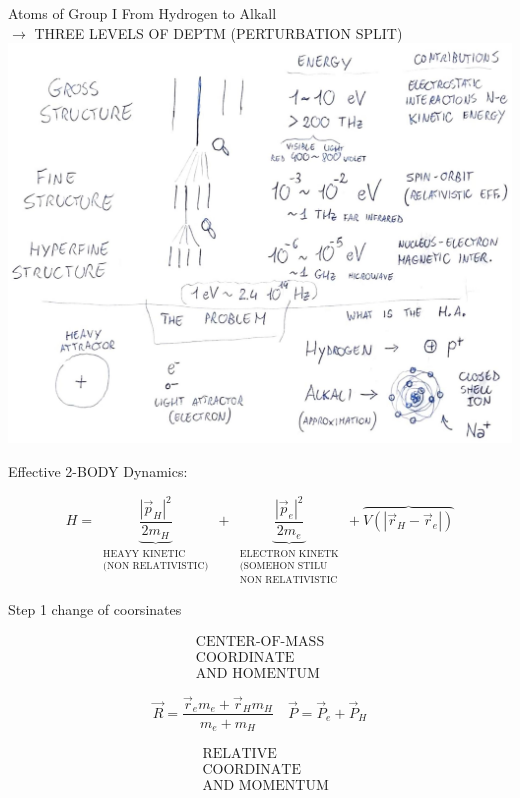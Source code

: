 \documentclass[10pt]{article}
\begin{document}
\captionsetup{singlelinecheck=false}
Atoms of Group I From Hydrogen to Alkall\\
$\rightarrow$ THREE LEVELS OF DEPTM (PERTURBATION SPLIT)\\
\includegraphics[max width=\textwidth, center]{2025_10_16_22329e0f50bdd2511b17g-01}

Effective 2-BODY Dynamics:

$$
H=\underbrace{\frac{\left|\vec{p}_{H}\right|^{2}}{2 m_{H}}}_{\substack{\text { HEAYY KINETIC } \\ \text { (NON RELATIVISTIC) }}}+\underbrace{\frac{\left|\vec{p}_{e}\right|^{2}}{2 m_{e}}}_{\substack{\text { ELECTRON KINETK } \\ \text { (SOMEHON STILU } \\ \text { NON RELATIVISTIC }}}+\overbrace{V\left(\left|\vec{r}_{H}-\vec{r}_{e}\right|\right)}
$$

Step 1 change of coorsinates

$$
\begin{gathered}
\text { CENTER-OF-MASS } \\
\text { COORDINATE } \\
\text { AND HOMENTUM }
\end{gathered}
$$

$$
\vec{R}=\frac{\vec{r}_{e} m_{e}+\vec{r}_{H} m_{H}}{m_{e}+m_{H}} \quad \vec{P}=\vec{P}_{e}+\vec{P}_{H}
$$

$$
\begin{aligned}
& \text { RELATIVE } \\
& \text { COORDINATE } \\
& \text { AND MOMENTUM }
\end{aligned}
$$
\end{document}
